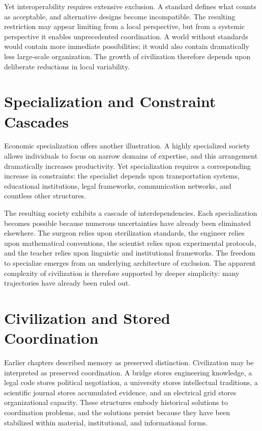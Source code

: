 \documentclass[11pt,oneside]{book}
\theoremstyle{plain}
\theoremstyle{definition}
\theoremstyle{remark}
\begin{document}
Yet interoperability requires extensive exclusion. A standard defines what counts as acceptable, and alternative designs become incompatible. The resulting restriction may appear limiting from a local perspective, but from a systemic perspective it enables unprecedented coordination. A world without standards would contain more immediate possibilities; it would also contain dramatically less large-scale organization. The growth of civilization therefore depends upon deliberate reductions in local variability.

\section{Specialization and Constraint Cascades}

Economic specialization offers another illustration. A highly specialized society allows individuals to focus on narrow domains of expertise, and this arrangement dramatically increases productivity. Yet specialization requires a corresponding increase in constraints: the specialist depends upon transportation systems, educational institutions, legal frameworks, communication networks, and countless other structures.

The resulting society exhibits a cascade of interdependencies. Each specialization becomes possible because numerous uncertainties have already been eliminated elsewhere. The surgeon relies upon sterilization standards, the engineer relies upon mathematical conventions, the scientist relies upon experimental protocols, and the teacher relies upon linguistic and institutional frameworks. The freedom to specialize emerges from an underlying architecture of exclusion. The apparent complexity of civilization is therefore supported by deeper simplicity: many trajectories have already been ruled out.

\section{Civilization and Stored Coordination}

Earlier chapters described memory as preserved distinction. Civilization may be interpreted as preserved coordination. A bridge stores engineering knowledge, a legal code stores political negotiation, a university stores intellectual traditions, a scientific journal stores accumulated evidence, and an electrical grid stores organizational capacity. These structures embody historical solutions to coordination problems, and the solutions persist because they have been stabilized within material, institutional, and informational forms.
\end{document}
